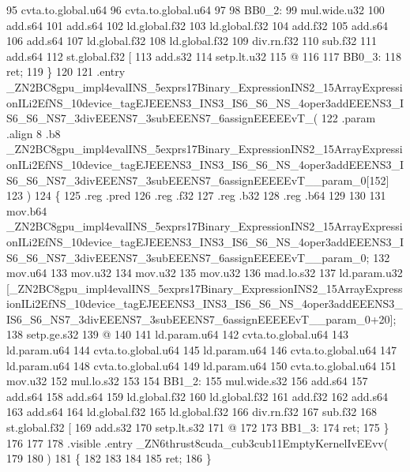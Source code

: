 \begin{DoxyCode}
95 cvta.to.global.u64 %
96 cvta.to.global.u64 %
97 
98 BB0\_2:
99 mul.wide.u32 %
100 add.s64 %
101 add.s64 %
102 ld.global.f32 %
103 ld.global.f32 %
104 add.f32 %
105 add.s64 %
106 add.s64 %
107 ld.global.f32 %
108 ld.global.f32 %
109 div.rn.f32 %
110 sub.f32 %
111 add.s64 %
112 st.global.f32 [%
113 add.s32 %
114 setp.lt.u32 %
115 @%
116 
117 BB0\_3:
118 ret;
119 \}
120 
121 .entry
       \_ZN2BC8gpu\_impl4evalINS\_5exprs17Binary\_ExpressionINS2\_15ArrayExpressionILi2EfNS\_10device\_tagEJEEENS3\_INS3\_IS6\_S6\_NS\_4oper3addEEENS3\_IS6\_S6\_NS7\_3divEEENS7\_3subEEENS7\_6assignEEEEEvT\_(
122 .param .align 8 .b8
       \_ZN2BC8gpu\_impl4evalINS\_5exprs17Binary\_ExpressionINS2\_15ArrayExpressionILi2EfNS\_10device\_tagEJEEENS3\_INS3\_IS6\_S6\_NS\_4oper3addEEENS3\_IS6\_S6\_NS7\_3divEEENS7\_3subEEENS7\_6assignEEEEEvT\_\_param\_0[152]
123 )
124 \{
125 .reg .pred %
126 .reg .f32 %
127 .reg .b32 %
128 .reg .b64 %
129 
130 
131 mov.b64 %
       \_ZN2BC8gpu\_impl4evalINS\_5exprs17Binary\_ExpressionINS2\_15ArrayExpressionILi2EfNS\_10device\_tagEJEEENS3\_INS3\_IS6\_S6\_NS\_4oper3addEEENS3\_IS6\_S6\_NS7\_3divEEENS7\_3subEEENS7\_6assignEEEEEvT\_\_param\_0;
132 mov.u64 %
133 mov.u32 %
134 mov.u32 %
135 mov.u32 %
136 mad.lo.s32 %
137 ld.param.u32 %
       [\_ZN2BC8gpu\_impl4evalINS\_5exprs17Binary\_ExpressionINS2\_15ArrayExpressionILi2EfNS\_10device\_tagEJEEENS3\_INS3\_IS6\_S6\_NS\_4oper3addEEENS3\_IS6\_S6\_NS7\_3divEEENS7\_3subEEENS7\_6assignEEEEEvT\_\_param\_0+20];
138 setp.ge.s32 %
139 @%
140 
141 ld.param.u64 %
142 cvta.to.global.u64 %
143 ld.param.u64 %
144 cvta.to.global.u64 %
145 ld.param.u64 %
146 cvta.to.global.u64 %
147 ld.param.u64 %
148 cvta.to.global.u64 %
149 ld.param.u64 %
150 cvta.to.global.u64 %
151 mov.u32 %
152 mul.lo.s32 %
153 
154 BB1\_2:
155 mul.wide.s32 %
156 add.s64 %
157 add.s64 %
158 add.s64 %
159 ld.global.f32 %
160 ld.global.f32 %
161 add.f32 %
162 add.s64 %
163 add.s64 %
164 ld.global.f32 %
165 ld.global.f32 %
166 div.rn.f32 %
167 sub.f32 %
168 st.global.f32 [%
169 add.s32 %
170 setp.lt.s32 %
171 @%
172 
173 BB1\_3:
174 ret;
175 \}
176 
177 
178 .visible .entry \_ZN6thrust8cuda\_cub3cub11EmptyKernelIvEEvv(
179 
180 )
181 \{
182 
183 
184 
185 ret;
186 \}
\end{DoxyCode}
 